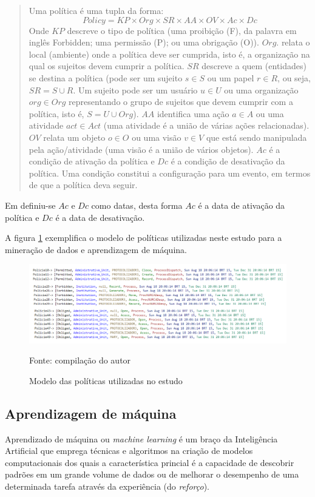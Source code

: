 \begin{quotation}
	Uma política é uma tupla da forma:
	\begin{equation}\label{key}
	Policy = KP \times Org \times SR \times AA \times OV \times Ac \times Dc
	\end{equation}
	Onde $ KP $ descreve o tipo de política (uma proibição (F), da palavra em inglês Forbidden; uma permissão (P); ou uma obrigação (O)). $ Org $. relata o local (ambiente) onde a política deve ser cumprida, isto é, a organização na qual os sujeitos devem cumprir a política. $ SR $ descreve a quem (entidades) se destina a política (pode ser um sujeito $ s \in S $ ou um papel $ r \in R $, ou seja, $ SR = S \cup R $. Um sujeito pode ser um usuário $ u \in U $ ou uma organização $ org \in Org $ representando o grupo de sujeitos que devem cumprir com a política, isto é, $ S = U \cup Org $). $ AA $ identifica uma ação $ a \in A  $ ou uma atividade $ act \in Act  $ (uma atividade é a união de várias ações relacionadas). $ OV $ relata um objeto $ o \in O $ ou uma visão $ v \in V $ que está sendo manipulada pela ação/atividade (uma visão é a união de vários objetos). $ Ac $ é a condição de ativação da política e $ Dc $ é a condição de desativação da política. Uma condição constitui a configuração para um evento, em termos de que a política deva seguir. 
\end{quotation}

Em \cite{sarkis2017} definiu-se $ Ac $ e $ Dc $ como datas, desta forma $ Ac $ é a data de ativação da política e $ Dc $ é a data de desativação.

A figura \ref{fig:modelo_politica} exemplifica o modelo de políticas utilizadas neste estudo para a mineração de dados e aprendizagem de máquina.

\begin{figure}[h!]
	\centering
	\includegraphics[width=.8\textwidth]{imagens/modelo_politica.png}
	\caption{Modelo das políticas utilizadas no estudo}
	{\scriptsize Fonte: compilação do autor}
	\label{fig:modelo_politica}
\end{figure}

\subsection{Aprendizagem de máquina} \label{aprendizagem_maquina}
Aprendizado de máquina ou \textit{machine learning} é um braço da Inteligência Artificial que emprega técnicas e algoritmos na criação de modelos computacionais dos quais a característica princial é a capacidade de descobrir padrões em um grande volume de dados ou de melhorar o desempenho de uma determinada tarefa através da experiência (do \textit{reforço}).\cite{mohri_foundations_2018} \cite{alpaydin_introduction_2014} \cite{swamynathan_mastering_2019}

